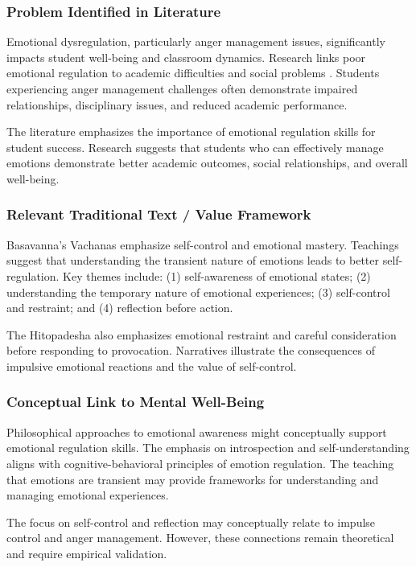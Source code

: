 \documentclass[12pt,a4paper,twocolumn]{article}
\begin{document}
\subsubsection{Problem Identified in Literature}

Emotional dysregulation, particularly anger management issues, significantly impacts student well-being and classroom dynamics. Research links poor emotional regulation to academic difficulties and social problems \citep{Kumar2018}. Students experiencing anger management challenges often demonstrate impaired relationships, disciplinary issues, and reduced academic performance.

The literature emphasizes the importance of emotional regulation skills for student success. Research suggests that students who can effectively manage emotions demonstrate better academic outcomes, social relationships, and overall well-being.

\subsubsection{Relevant Traditional Text / Value Framework}

Basavanna's Vachanas emphasize self-control and emotional mastery. Teachings suggest that understanding the transient nature of emotions leads to better self-regulation. Key themes include: (1) self-awareness of emotional states; (2) understanding the temporary nature of emotional experiences; (3) self-control and restraint; and (4) reflection before action.

The Hitopadesha also emphasizes emotional restraint and careful consideration before responding to provocation. Narratives illustrate the consequences of impulsive emotional reactions and the value of self-control.

\subsubsection{Conceptual Link to Mental Well-Being}

Philosophical approaches to emotional awareness might conceptually support emotional regulation skills. The emphasis on introspection and self-understanding aligns with cognitive-behavioral principles of emotion regulation. The teaching that emotions are transient may provide frameworks for understanding and managing emotional experiences.

The focus on self-control and reflection may conceptually relate to impulse control and anger management. However, these connections remain theoretical and require empirical validation.
\end{document}
